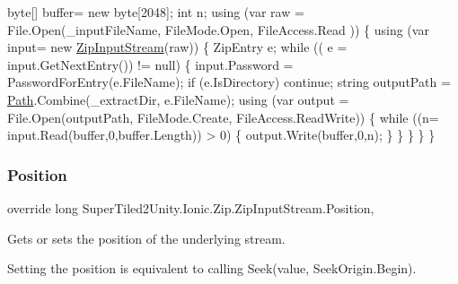 \begin{DoxyCode}
byte[] buffer= \textcolor{keyword}{new} byte[2048];
\textcolor{keywordtype}{int} n;
\textcolor{keyword}{using} (var raw = File.Open(\_inputFileName, FileMode.Open, FileAccess.Read ))
\{
    \textcolor{keyword}{using} (var input= \textcolor{keyword}{new} \mbox{\hyperlink{class_super_tiled2_unity_1_1_ionic_1_1_zip_1_1_zip_input_stream_af9203130f058abb23317725bcb98c047}{ZipInputStream}}(raw))
    \{
        ZipEntry e;
        \textcolor{keywordflow}{while} (( e = input.GetNextEntry()) != null)
        \{
            input.Password = PasswordForEntry(e.FileName);
            \textcolor{keywordflow}{if} (e.IsDirectory) \textcolor{keywordflow}{continue};
            \textcolor{keywordtype}{string} outputPath = \mbox{\hyperlink{namespace_path}{Path}}.Combine(\_extractDir, e.FileName);
            \textcolor{keyword}{using} (var output = File.Open(outputPath, FileMode.Create, FileAccess.ReadWrite))
            \{
                \textcolor{keywordflow}{while} ((n= input.Read(buffer,0,buffer.Length)) > 0)
                \{
                    output.Write(buffer,0,n);
                \}
            \}
        \}
    \}
\}
\end{DoxyCode}
 \mbox{\label{class_super_tiled2_unity_1_1_ionic_1_1_zip_1_1_zip_input_stream_a5320273749e8a3c5c5676b7e19b612d2}} 
\subsubsection{\texorpdfstring{Position}{Position}}
{\footnotesize\ttfamily override long Super\+Tiled2\+Unity.\+Ionic.\+Zip.\+Zip\+Input\+Stream.\+Position\hspace{0.3cm}{\ttfamily [get]}, {\ttfamily [set]}}



Gets or sets the position of the underlying stream. 

Setting the position is equivalent to calling {\ttfamily Seek(value, Seek\+Origin.\+Begin)}. \mbox{\label{class_super_tiled2_unity_1_1_ionic_1_1_zip_1_1_zip_input_stream_a0b2b02e8e22ba92c63f7a77852abf062}} 
